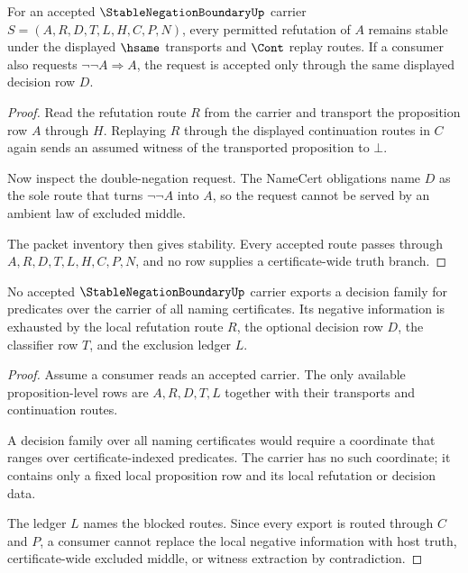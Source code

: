 \begin{theorem}
\label{thm:stable-negation-boundary-decidable-refutation-stability}
For an accepted $\StableNegationBoundaryUp$ carrier $S=(A,R,D,T,L,H,C,P,N)$, every permitted refutation of $A$ remains stable under the displayed $\hsame$ transports and $\Cont$ replay routes. If a consumer also requests $\neg\neg A \Rightarrow A$, the request is accepted only through the same displayed decision row $D$.
\end{theorem}
\begin{proof}
Read the refutation route $R$ from the carrier and transport the proposition row $A$ through $H$. Replaying $R$ through the displayed continuation routes in $C$ again sends an assumed witness of the transported proposition to $\bot$.

Now inspect the double-negation request. The NameCert obligations name $D$ as the sole route that turns $\neg\neg A$ into $A$, so the request cannot be served by an ambient law of excluded middle.

The packet inventory then gives stability. Every accepted route passes through $A,R,D,T,L,H,C,P,N$, and no row supplies a certificate-wide truth branch.
\end{proof}

\begin{theorem}
\label{thm:stable-negation-boundary-certificate-truth-non-escape}
No accepted $\StableNegationBoundaryUp$ carrier exports a decision family for predicates over the carrier of all naming certificates. Its negative information is exhausted by the local refutation route $R$, the optional decision row $D$, the classifier row $T$, and the exclusion ledger $L$.
\end{theorem}
\begin{proof}
Assume a consumer reads an accepted carrier. The only available proposition-level rows are $A,R,D,T,L$ together with their transports and continuation routes.

A decision family over all naming certificates would require a coordinate that ranges over certificate-indexed predicates. The carrier has no such coordinate; it contains only a fixed local proposition row and its local refutation or decision data.

The ledger $L$ names the blocked routes. Since every export is routed through $C$ and $P$, a consumer cannot replace the local negative information with host truth, certificate-wide excluded middle, or witness extraction by contradiction.
\end{proof}

